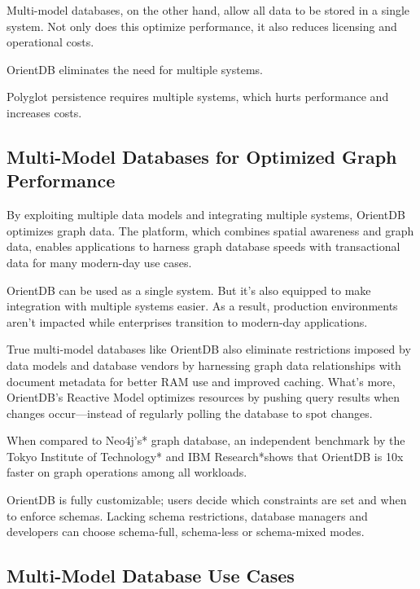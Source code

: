 \documentclass[
	final,
	a4paper,
	oneside,
	parskip=half,
	headings=standardclasses,
	headings=big,
	pointednumbers,
    fleqn
]{scrartcl}
\begin{document}
\begin{multicols*}{2}
            Multi-model databases, on the other hand, allow all data to be stored in a single system. Not only does this optimize performance, it also reduces licensing and operational costs.
            
            OrientDB eliminates the need for multiple systems.
            
            Polyglot persistence requires multiple systems, which hurts performance and increases costs.

        \subsection{Multi-Model Databases for Optimized Graph Performance}

            By exploiting multiple data models and integrating multiple systems, OrientDB optimizes graph data. The platform, which combines spatial awareness and graph data, enables applications to harness graph database speeds with transactional data for many modern-day use cases.
            
            OrientDB can be used as a single system. But it’s also equipped to make integration with multiple systems easier. As a result, production environments aren’t impacted while enterprises transition to modern-day applications.
            
            True multi-model databases like OrientDB also eliminate restrictions imposed by data models and database vendors by harnessing graph data relationships with document metadata for better RAM use and improved caching. What’s more, OrientDB’s Reactive Model optimizes resources by pushing query results when changes occur—instead of regularly polling the database to spot changes.
            
            When compared to Neo4j’s* graph database, an independent benchmark by the Tokyo Institute of Technology* and IBM Research*shows that OrientDB is 10x faster on graph operations among all workloads.
            
            OrientDB is fully customizable; users decide which constraints are set and when to enforce schemas. Lacking schema restrictions, database managers and developers can choose schema-full, schema-less or schema-mixed modes.

        \subsection{Multi-Model Database Use Cases}


\end{multicols*}
\end{document}
